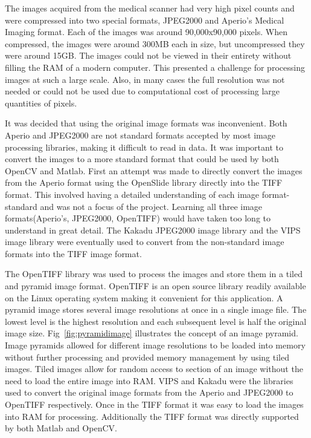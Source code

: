 \documentclass[letterpaper,10pt,oneside]{article}
\begin{document}
The images acquired from the medical scanner had very high pixel counts and were compressed into two special formats, JPEG2000 and Aperio's Medical Imaging format. Each of the images was around 90,000x90,000 pixels. When compressed, the images were around 300MB each in size, but uncompressed they were around 15GB. The images could not be viewed in their entirety without filling the RAM of a modern computer. This presented a challenge for processing images at such a large scale. Also, in many cases the full resolution was not needed or could not be used due to computational cost of processing large quantities of pixels.

It was decided that using the original image formats was inconvenient. Both Aperio and JPEG2000 are not standard formats accepted by most image processing libraries, making it difficult to read in data. It was important to convert the images to a more standard format that could be used by both OpenCV and Matlab. First an attempt was made to directly convert the images from the Aperio format using the OpenSlide library directly into the TIFF format. This involved having a detailed understanding of each image format-standard and was not a focus of the project. Learning all three image formats(Aperio's, JPEG2000, OpenTIFF) would have taken too long to understand in great detail. The Kakadu JPEG2000 image library and the VIPS image library were eventually used to convert from the non-standard image formats into the TIFF image format.

The OpenTIFF library was used to process the images and store them in a tiled and pyramid image format. OpenTIFF is an open source library readily available on the Linux operating system making it convenient for this application. A pyramid image stores several image resolutions at once in a single image file. The lowest level is the highest resolution and each subsequent level is half the original image size. Fig~\ref{fig:pyramidimage} illustrates the concept of an image pyramid. Image pyramids allowed for different image resolutions to be loaded into memory without further processing and provided memory management by using tiled images. Tiled images allow for random access to section of an image without the need to load the entire image into RAM. VIPS and Kakadu were the libraries used to convert the original image formats from the Aperio and JPEG2000 to OpenTIFF respectively. Once in the TIFF format it was easy to load the images into RAM for processing. Additionally the TIFF format was directly supported by both Matlab and OpenCV.
\end{document}
